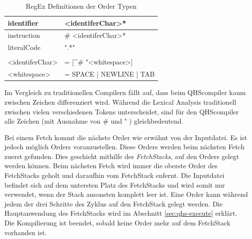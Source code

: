 \begin{table}[h]
    \centering
    \caption{RegEx Definitionen der Order Typen}
    \vspace{3mm} %
    
    \begin{tabular}{ll}
    \multicolumn{1}{l|}{identifier}        & \textless{}identiferChar\textgreater{}*                           \\ \hline
    \multicolumn{1}{l|}{instruction}       & \# \textless{}identiferChar\textgreater{}*                        \\ \hline
    \multicolumn{1}{l|}{literalCode}       & ".*"                                                              \\
                                           &                                                                   \\
    \textless{}identiferChar\textgreater{} & = {[}\textasciicircum{}\# "\textless{}whitespace\textgreater{}{]} \\
    \textless{}whitespace\textgreater{}    & = SPACE | NEWLINE | TAB
    
    \end{tabular}
\end{table}

Im Vergleich zu traditionellen Compilern fällt auf, dass beim QHScompiler kaum zwischen Zeichen differenziert wird. Während die Lexical Analysis traditionell zwischen vielen verschiedenen Tokens unterscheidet,
sind für den QHScompiler alle Zeichen (mit Ausnahme von \# und " ) gleichbedeutend.

Bei einem Fetch kommt die nächste Order wie erwähnt von der Inputdatei.
Es ist jedoch möglich Orders voranzustellen. Diese Orders werden beim nächsten Fetch zuerst gefunden. Dies geschieht mithilfe des \textit{FetchStacks}, auf den Orders gelegt werden können.
Beim nächsten Fetch wird immer die oberste Order des FetchStacks geholt und daraufhin vom FetchStack enfernt.
Die Inputdatei befindet sich auf dem untersten Platz des FetchStacks und wird somit nur verwendet, wenn der Stack ansonsten komplett leer ist.
Eine Order kann während jedem der drei Schritte des Zyklus auf den FetchStack gelegt werden.
%
%
Die Hauptanwendung des FetchStacks wird im Abschnitt \ref{sec:qhs-execute} erklärt.
Die Kompilierung ist beendet, sobald keine Order mehr auf dem FetchStack vorhanden ist.

